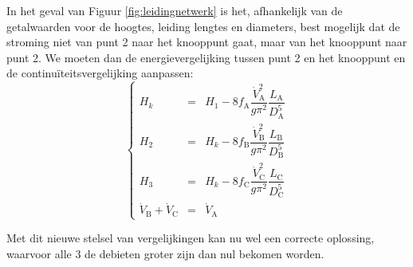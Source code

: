 In het geval van Figuur \ref{fig:leidingnetwerk} is het, afhankelijk van de getalwaarden voor de hoogtes, leiding lengtes en diameters, best mogelijk dat de stroming niet van punt 2 naar het knooppunt gaat, maar van het knooppunt naar punt 2. We moeten dan de energievergelijking tussen punt 2 en het knooppunt en de continuïteitsvergelijking aanpassen:
\begin{equation}
	\left\{
	\begin{array}{lcl}
		H_k &=& H_1 - 8 f_\mathrm{A} \dfrac{\dot{V}_\mathrm{A}^2}{g \pi^2} \dfrac{L_\mathrm{A}}{D_\mathrm{A}^5} \\
		H_2 &=& H_k - 8 f_\mathrm{B} \dfrac{\dot{V}_\mathrm{B}^2}{g \pi^2} \dfrac{L_\mathrm{B}}{D_\mathrm{B}^5} \\
		H_3 &=& H_k - 8 f_\mathrm{C} \dfrac{\dot{V}_\mathrm{C}^2}{g \pi^2} \dfrac{L_\mathrm{C}}{D_\mathrm{C}^5} \\
		\dot{V}_\mathrm{B} + \dot{V}_\mathrm{C} &=& \dot{V}_\mathrm{A} 
	\end{array}
	\right.
	\label{eqn:3reservoirs stelsel2}
\end{equation}

Met dit nieuwe stelsel van vergelijkingen kan nu wel een correcte oplossing, waarvoor alle 3 de debieten groter zijn dan nul bekomen worden.

